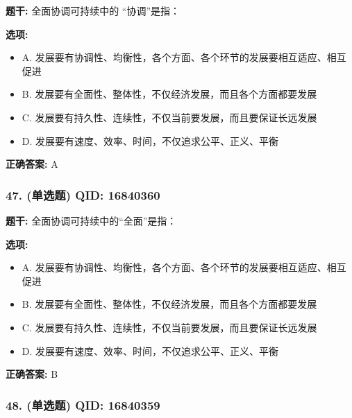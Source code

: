 \documentclass[12pt,UTF8]{ctexart}
\begin{document}
\textbf{题干:}
全面协调可持续中的 “协调”是指：

\textbf{选项:}
\begin{itemize}[leftmargin=*]

  \item A. 发展要有协调性、均衡性，各个方面、各个环节的发展要相互适应、相互促进

  \item B. 发展要有全面性、整体性，不仅经济发展，而且各个方面都要发展

  \item C. 发展要有持久性、连续性，不仅当前要发展，而且要保证长远发展

  \item D. 发展要有速度、效率、时间，不仅追求公平、正义、平衡

\end{itemize}

\textbf{正确答案:}
A

\vspace{0.3em}\hrulefill\vspace{0.7em}

\subsubsection*{47. (单选题) \small QID: 16840360}

\textbf{题干:}
全面协调可持续中的“全面”是指：

\textbf{选项:}
\begin{itemize}[leftmargin=*]

  \item A. 发展要有协调性、均衡性，各个方面、各个环节的发展要相互适应、相互促进

  \item B. 发展要有全面性、整体性，不仅经济发展，而且各个方面都要发展

  \item C. 发展要有持久性、连续性，不仅当前要发展，而且要保证长远发展

  \item D. 发展要有速度、效率、时间，不仅追求公平、正义、平衡

\end{itemize}

\textbf{正确答案:}
B

\vspace{0.3em}\hrulefill\vspace{0.7em}

\subsubsection*{48. (单选题) \small QID: 16840359}
\end{document}
